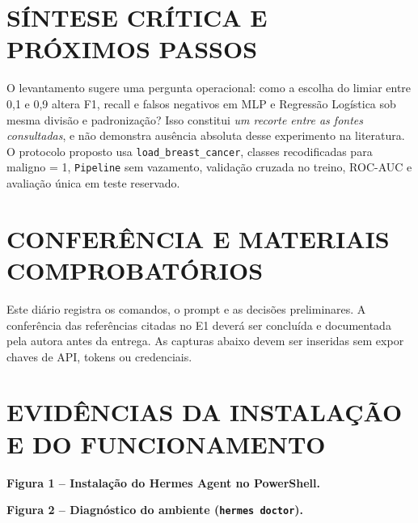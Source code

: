 \documentclass[article,12pt,oneside,a4paper,english,brazil,sumario=tradicional]{abntex2}
\begin{document}
\section{SÍNTESE CRÍTICA E PRÓXIMOS PASSOS}
O levantamento sugere uma pergunta operacional: como a escolha do limiar entre 0,1 e 0,9 altera F1, recall e falsos negativos em MLP e Regressão Logística sob mesma divisão e padronização? Isso constitui \textit{um recorte entre as fontes consultadas}, e não demonstra ausência absoluta desse experimento na literatura. O protocolo proposto usa \texttt{load\_breast\_cancer}, classes recodificadas para maligno = 1, \texttt{Pipeline} sem vazamento, validação cruzada no treino, ROC-AUC e avaliação única em teste reservado.
\section{CONFERÊNCIA E MATERIAIS COMPROBATÓRIOS}
Este diário registra os comandos, o prompt e as decisões preliminares. A conferência das referências citadas no E1 deverá ser concluída e documentada pela autora antes da entrega. As capturas abaixo devem ser inseridas sem expor chaves de API, tokens ou credenciais.

\clearpage
\section{EVIDÊNCIAS DA INSTALAÇÃO E DO FUNCIONAMENTO}
\noindent\textbf{Figura 1 -- Instalação do Hermes Agent no PowerShell.}\\[-2pt]
\begin{center}\end{center}
\noindent\textbf{Figura 2 -- Diagnóstico do ambiente (\texttt{hermes doctor}).}\\[-2pt]
\begin{center}\end{center}

\clearpage
\end{document}
